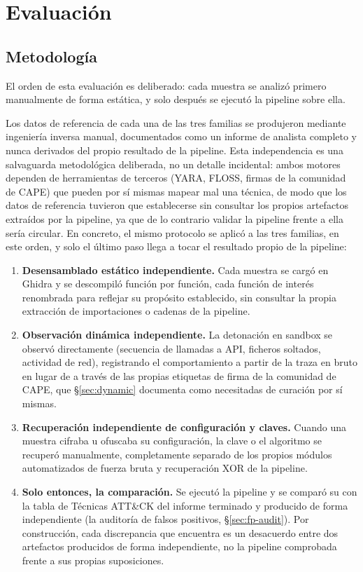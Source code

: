 \section{Evaluaci\'on}
\label{sec:evaluation}

\subsection{Metodolog\'ia}

El orden de esta evaluaci\'on es deliberado: cada muestra se
analiz\'o primero manualmente de forma est\'atica, y solo despu\'es se
ejecut\'o la pipeline sobre ella.

Los datos de referencia de cada una de las tres familias se
produjeron mediante ingenier\'ia inversa manual, documentados como un
informe de analista completo y nunca derivados del propio resultado
de la pipeline. Esta independencia es una salvaguarda metodol\'ogica
deliberada, no un detalle incidental: ambos motores dependen de
herramientas de terceros (YARA, FLOSS, firmas de la comunidad de CAPE)
que pueden por s\'i mismas mapear mal una t\'ecnica, de modo que los
datos de referencia tuvieron que establecerse sin consultar los propios
artefactos extra\'idos por la pipeline, ya que de lo contrario validar
la pipeline frente a ella ser\'ia circular. En concreto, el mismo
protocolo se aplic\'o a las tres familias, en este orden, y solo el
\'ultimo paso llega a tocar el resultado propio de la pipeline:

\begin{enumerate}
  \item \textbf{Desensamblado est\'atico independiente.} Cada muestra
    se carg\'o en Ghidra y se descompil\'o funci\'on por funci\'on, cada
    funci\'on de inter\'es renombrada para reflejar su prop\'osito
    establecido, sin consultar la propia extracci\'on de importaciones
    o cadenas de la pipeline.
  \item \textbf{Observaci\'on din\'amica independiente.} La detonaci\'on
    en sandbox se observ\'o directamente (secuencia de llamadas a API,
    ficheros soltados, actividad de red), registrando el comportamiento
    a partir de la traza en bruto en lugar de a trav\'es de las propias
    etiquetas de firma de la comunidad de CAPE, que \S\ref{sec:dynamic}
    documenta como necesitadas de curaci\'on por s\'i mismas.
  \item \textbf{Recuperaci\'on independiente de configuraci\'on y
    claves.} Cuando una muestra cifraba u ofuscaba su configuraci\'on,
    la clave o el algoritmo se recuper\'o manualmente, completamente
    separado de los propios m\'odulos automatizados de fuerza bruta y
    recuperaci\'on XOR de la pipeline.
  \item \textbf{Solo entonces, la comparaci\'on.} Se ejecut\'o la
    pipeline y se compar\'o su  con la tabla
    de T\'ecnicas ATT\&CK del informe terminado y producido de forma
    independiente (la auditor\'ia de falsos positivos,
    \S\ref{sec:fp-audit}). Por construcci\'on, cada discrepancia que
    encuentra es un desacuerdo entre dos artefactos producidos de forma
    independiente, no la pipeline comprobada frente a sus propias
    suposiciones.
\end{enumerate}

